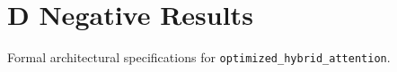 \section{D Negative Results}

Formal architectural specifications for \texttt{optimized_hybrid_attention}.

